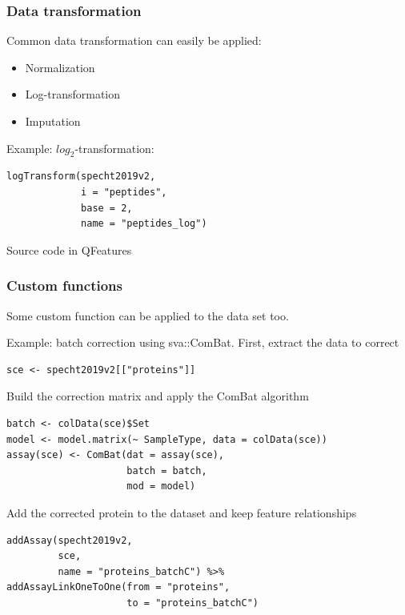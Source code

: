 \documentclass{beamer}
\newcommand{\hcode}[2][lgray]{{\ttfamily\color{vdgray}\colorbox{#1}{#2}}}
\newcommand{\frametitlesection}[1]{\frametitle{\centering #1 \footnotesize \hspace{0pt plus 1 filll} \insertsection}}
\begin{document}
\begin{frame}[fragile]
    \frametitlesection{Data transformation}
    
    Common data transformation can easily be applied:
    
    \begin{itemize}
        \item{Normalization}
        \item{Log-transformation}
        \item{Imputation}
    \end{itemize}
    
    Example: $log_2$-transformation:
    
    \begin{lstlisting}
logTransform(specht2019v2, 
             i = "peptides", 
             base = 2,
             name = "peptides_log")
    \end{lstlisting}
    
    Source code in \hcode{QFeatures}
    
\end{frame}

\begin{frame}[fragile]
    \frametitlesection{Custom functions}
    
    Some custom function can be applied to the data set too. 
    
    Example: batch correction using \hcode{sva::ComBat}. First, extract the data 
    to correct
    
    \begin{lstlisting}[basicstyle = \scriptsize\ttfamily\color{vdgray}]
sce <- specht2019v2[["proteins"]]
    \end{lstlisting}
    
    Build the correction matrix and apply the ComBat algorithm
    
    \begin{lstlisting}[basicstyle = \scriptsize\ttfamily\color{vdgray}]
batch <- colData(sce)$Set
model <- model.matrix(~ SampleType, data = colData(sce))
assay(sce) <- ComBat(dat = assay(sce), 
                     batch = batch, 
                     mod = model)
    \end{lstlisting}
    
    Add the corrected protein to the dataset and keep feature relationships
    
    \begin{lstlisting}[basicstyle = \scriptsize\ttfamily\color{vdgray}]
addAssay(specht2019v2,
         sce,
         name = "proteins_batchC") %>%
addAssayLinkOneToOne(from = "proteins",
                     to = "proteins_batchC")
    \end{lstlisting}
    
    
\end{frame}
\end{document}
